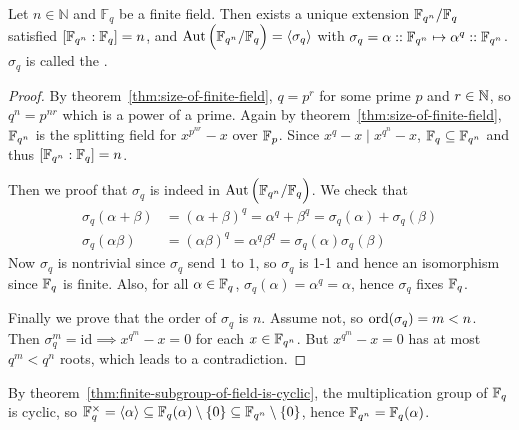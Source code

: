 \begin{theorem}
  Let $n \in \mathbb{N}$ and $\mathbb{F}_q$ be a finite field. Then exists a unique extension
  $\mathbb{F}_{q^n} / \mathbb{F}_q$ satisfied $[\mathbb{F}_{q^n} : \mathbb{F}_q] = n$, and $\operatorname{Aut} \Big( \mathbb{F}_{q^n} / \mathbb{F}_q \Big) =
  \langle \sigma_q \rangle$ with $\sigma_q = \alpha :: \mathbb{F}_{q^n} \mapsto \alpha^q :: \mathbb{F}_{q^n}$.
  $\sigma_q$ is called the \emph{}.

  \begin{proof}
    By theorem~\ref{thm:size-of-finite-field},
    $q = p^r$ for some prime $p$ and $r \in \mathbb{N}$, so $q^n = p^{nr}$ which is a power of
    a prime. Again by theorem~\ref{thm:size-of-finite-field},
    $\mathbb{F}_{q^n}$ is the splitting field for $x^{p^{nr}} - x$ over $\mathbb{F}_p$.
    Since $x^q - x \mid x^{q^n} - x$, $\mathbb{F}_q \subseteq \mathbb{F}_{q^n}$ and thus $[\mathbb{F}_{q^n}: \mathbb{F}_{q}] = n$.

    Then we proof that $\sigma_q$ is indeed in $\operatorname{Aut} \Big( {\mathbb{F}_{q^n}}/{\mathbb{F}_q} \Big)$.
    We check that
    \[
      \begin{aligned}
        \sigma_q(\alpha+\beta) &= (\alpha+\beta)^q = \alpha^q + \beta^q = \sigma_q(\alpha) + \sigma_q(\beta) \\
        \sigma_q(\alpha\beta) &= (\alpha\beta)^q = \alpha^q \beta^q = \sigma_q(\alpha) \sigma_q(\beta)
      \end{aligned}
    \]
    Now $\sigma_q$ is nontrivial since $\sigma_q$ send $1$ to $1$, so $\sigma_q$ is 1-1 and hence an
    isomorphism since $\mathbb{F}_q$ is finite. Also, for all $\alpha \in \mathbb{F}_q$, $\sigma_q(\alpha)
    = \alpha^{q} = \alpha$, hence $\sigma_q$ fixes $\mathbb{F}_q$.

    Finally we prove that the order of $\sigma_q$ is $n$. Assume not, so $\operatorname{ord}(\sigma_q) = m < n$.
    Then $\sigma_q^m = \mathrm{id} \implies x^{q^m} - x=0$ for each $x \in \mathbb{F}_{q^n}$.
    But $x^{q^m} - x = 0$ has at most $q^m < q^n$ roots, which leads to a contradiction.
  \end{proof}
\end{theorem}

\begin{remark}
  By theorem~\ref{thm:finite-subgroup-of-field-is-cyclic}, the multiplication group of $\mathbb{F}_q$ is cyclic,
  so $\mathbb{F}_q^\times = \langle \alpha \rangle
  \subseteq \mathbb{F}_q(\alpha) \setminus \{0\} \subseteq \mathbb{F}_{q^n} \setminus \{0\}$,
  hence $\mathbb{F}_{q^n} = \mathbb{F}_q(\alpha)$.
\end{remark}

